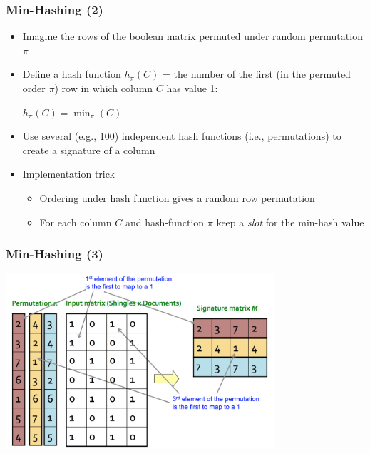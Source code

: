 \documentclass[svgnames]{beamer}
\begin{document}
  
\begin{frame} \frametitle{Min-Hashing (2)}

\begin{itemize}
\item Imagine the rows of the boolean matrix permuted under random permutation $\pi$
\item Define a hash function $h_\pi(C)$ = the number of the first (in the permuted order $\pi$) row in which column $C$ has value 1:  
  \begin{center}
  $h_\pi (C) = \min_\pi(C)$
  \end{center}
\item Use several (e.g., 100) independent hash functions (i.e., permutations) to create a signature of a column
\item Implementation trick 
 \begin{itemize}
 \item Ordering under hash function gives a random row permutation
 \item For each column $C$ and hash-function $\pi$ keep a {\it slot} for the min-hash value
 \end{itemize}
\end{itemize}
\end{frame}

  
\begin{frame} \frametitle{Min-Hashing (3)}
\includegraphics[width=10cm]{minhash}
\end{frame}

  
\end{document}
